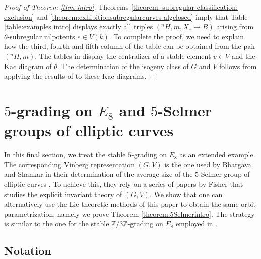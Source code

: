 \documentclass{article} %
\numberwithin{equation}{section}
\theoremstyle{definition}
\newcommand{\Z}{\mathbb{Z}}
\begin{document}
\begin{proof}[Proof of Theorem \ref{thm-intro}]
    Theorems \ref{theorem: subregular classification: exclusion} and \ref{theorem:exhibitionsubregularcurves-algclosed} imply that Table \ref{table:examples intro} displays exactly all triples $(^nH,m,X_e\rightarrow B)$ arising from $\theta$-subregular nilpotents $e\in V(k)$.
    To complete the proof, we need to explain how the third, fourth and fifth column of the table can be obtained from the pair $(^nH,m)$.
    The tables in \cite[Sections 7.1 and 7.2]{GrossLevyReederYu-GradingsPosRank} display the centralizer of a stable element $v\in V$ and the Kac diagram of $\theta$.
    The determination of the isogeny class of $\tilde{G}$ and $V$ follows from applying the results of \cite{Reeder-torsion} to these Kac diagrams.
\end{proof}





\section{$5$-grading on $E_8$ and $5$-Selmer groups of elliptic curves}\label{section: 5 grading E8}

In this final section, we treat the stable $5$-grading on $E_8$ as an extended example. 
The corresponding Vinberg representation $(G,V)$ is the one used by Bhargava and Shankar in their determination of the average size of the $5$-Selmer group of elliptic curves \cite{BS-5Selmer}.
To achieve this, they rely on a series of papers by Fisher \cite{Fisher-invariantsgenusone, Fisher-invarianttheorynormalquinticI, Fisher-invarianttheoryquinticII, Fisher-minimisationreduction5coverings, FisherSadek-genusonedegree5squarefree} that studies the explicit invariant theory of $(G,V)$.
We show that one can alternatively use the Lie-theoretic methods of this paper to obtain the same orbit parametrization, namely we prove Theorem \ref{theorem:5Selmerintro}.
The strategy is similar to the one for the stable $\Z/3\Z$-grading on $E_8$ employed in \cite[Section 4.4]{Thorne-Romano-E8}.






\subsection{Notation}
\end{document}
